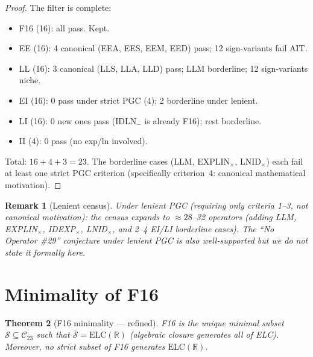\documentclass[11pt]{article}
\newtheorem{theorem}{Theorem}
\newtheorem{remark}[theorem]{Remark}
\begin{document}
\begin{proof}
The filter is complete:
\begin{itemize}
  \item F16 (16): all pass. Kept.
  \item EE (16): 4 canonical (EEA, EES, EEM, EED) pass; 12 sign-variants fail AIT.
  \item LL (16): 3 canonical (LLS, LLA, LLD) pass; LLM borderline; 12 sign-variants niche.
  \item EI (16): 0 pass under strict PGC (4); 2 borderline under lenient.
  \item LI (16): 0 new ones pass (IDLN$_-$ is already F16); rest borderline.
  \item II (4): 0 pass (no exp/ln involved).
\end{itemize}
Total: $16 + 4 + 3 = 23$.
The borderline cases (LLM, EXPLIN$_\times$, LNID$_\times$) each fail at least one strict
PGC criterion (specifically criterion~4: canonical mathematical motivation).
\end{proof}

\begin{remark}[Lenient census]
Under lenient PGC (requiring only criteria 1--3, not canonical motivation):
the census expands to $\approx 28$--32 operators (adding LLM, EXPLIN$_\times$,
IDEXP$_\times$, LNID$_\times$, and 2--4 EI/LI borderline cases).
The ``No Operator \#29'' conjecture under lenient PGC is also well-supported
but we do not state it formally here.
\end{remark}

\section{Minimality of F16}
\label{sec:minimality}

\begin{theorem}[F16 minimality --- refined]
\label{thm:f16min}
F16 is the unique minimal subset $\mathcal{S} \subseteq \mathcal{C}_{23}$ such that
$\overline{\mathcal{S}} = \mathrm{ELC}(\mathbb{R})$ (algebraic closure generates all of ELC).
Moreover, no strict subset of F16 generates $\mathrm{ELC}(\mathbb{R})$.
\end{theorem}
\end{document}
